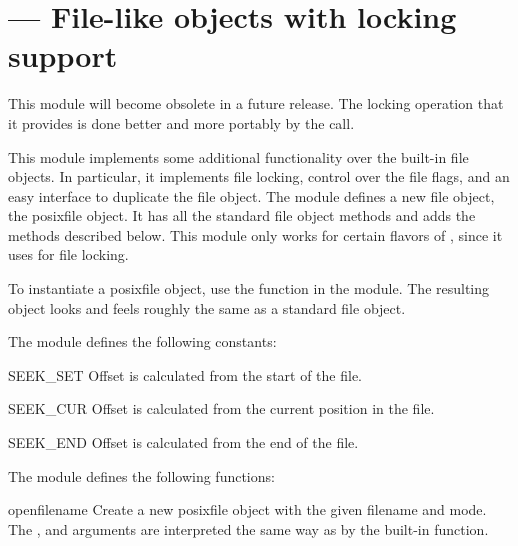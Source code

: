 \section{ ---
         File-like objects with locking support}




 This module will become obsolete in a future release.
The locking operation that it provides is done better and more
portably by the  call.%

This module implements some additional functionality over the built-in
file objects.  In particular, it implements file locking, control over
the file flags, and an easy interface to duplicate the file object.
The module defines a new file object, the posixfile object.  It
has all the standard file object methods and adds the methods
described below.  This module only works for certain flavors of
\UNIX{}, since it uses  for file locking.%

To instantiate a posixfile object, use the  function
in the  module.  The resulting object looks and
feels roughly the same as a standard file object.

The  module defines the following constants:


\begin{datadesc}{SEEK_SET}
Offset is calculated from the start of the file.
\end{datadesc}

\begin{datadesc}{SEEK_CUR}
Offset is calculated from the current position in the file.
\end{datadesc}

\begin{datadesc}{SEEK_END}
Offset is calculated from the end of the file.
\end{datadesc}

The  module defines the following functions:


\begin{funcdesc}{open}{filename}
 Create a new posixfile object with the given filename and mode.  The
 ,  and  arguments are
 interpreted the same way as by the built-in 
 function.
\end{funcdesc}

